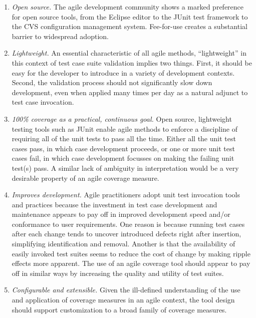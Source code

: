 \documentclass[10pt,twocolumn]{article}
\begin{document}
\begin{enumerate}
\item {\em Open source.} The agile development community shows a marked
preference for open source tools, from the Eclipse editor to the JUnit test
framework to the CVS configuration management system.  Fee-for-use creates
a substantial barrier to widespread adoption.

\item {\em Lightweight.} An essential characteristic of all agile methods,
``lightweight'' in this context of test case suite validation implies two
things. First, it should be easy for the developer to introduce in a
variety of development contexts. Second, the validation process should not
significantly slow down development, even when applied many times per day
as a natural adjunct to test case invocation.

\item {\em 100\% coverage as a practical, continuous goal.} Open source,
lightweight testing tools such as JUnit enable agile methods to enforce a
discipline of requiring all of the unit tests to pass all the time. Either
all the unit test cases pass, in which case development proceeds, or one or
more unit test cases fail, in which case development focusses on making the
failing unit test(s) pass.  A similar lack of ambiguity in interpretation
would be a very desirable property of an agile coverage measure.

\item {\em Improves development.}  Agile practitioners adopt unit test
invocation tools and practices because the investment in test case
development and maintenance appears to pay off in improved development
speed and/or conformance to user requirements. One reason is because
running test cases after each change tends to uncover introduced defects
right after insertion, simplifying identification and removal. Another is
that the availability of easily invoked test suites seems to reduce the
cost of change by making ripple effects more apparent. The use of an agile
coverage tool should appear to pay off in similar ways by increasing the
quality and utility of test suites.

\item {\em Configurable and extensible.} Given the ill-defined
understanding of the use and application of coverage measures in an agile
context, the tool design should support customization to a broad family of
coverage measures.

\end{enumerate}
\end{document}
